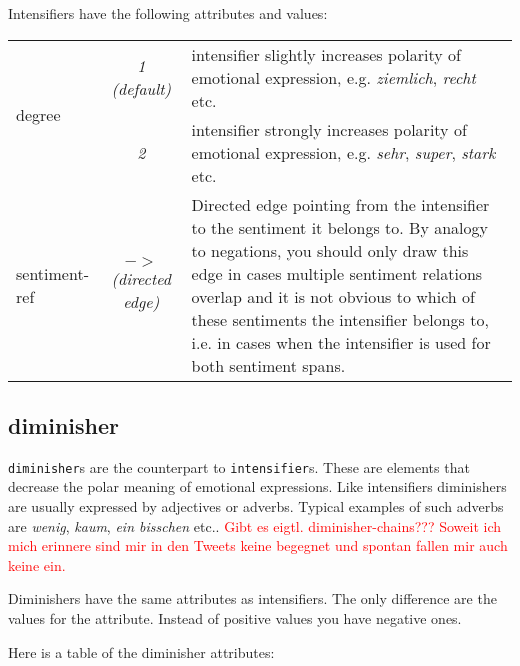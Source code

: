 \documentclass[11pt,a4paper]{article}
\begin{document}
Intensifiers have the following attributes and values: \newline

\begin{tabular}{|l|c|p{}|}\hline
  \multirow{2}{*}{degree} & \textit{1 (default)} & intensifier 
  slightly increases polarity of emotional
  expression, e.g. \textit{ziemlich},
  \textit{recht} etc.\\\cline{2-3}

  & \textit{2} & intensifier strongly increases polarity  of
  emotional expression, e.g. \textit{sehr}, \textit{super},
  \textit{stark} etc.\\\hline


  sentiment-ref & \textit{$->$\newline(directed edge)} & Directed
  edge pointing from the intensifier to the sentiment it belongs
  to. By analogy to negations, you should only draw this edge in cases
  multiple sentiment relations overlap and it is not obvious
  to which of these sentiments the intensifier belongs to,
  i.e. in cases when the intensifier is used for both
  sentiment spans.\\\hline
\end{tabular}


\subsection{diminisher}
\texttt{diminisher}s are the counterpart to \texttt{intensifier}s. 
These are elements that decrease the polar meaning of emotional expressions. 
Like intensifiers diminishers are usually expressed by adjectives or adverbs. Typical examples of such
adverbs are \textit{wenig}, \textit{kaum}, \textit{ein bisschen} etc.. 
\textcolor{red}{Gibt es eigtl. diminisher-chains??? Soweit ich mich erinnere sind mir in den Tweets keine begegnet und spontan fallen mir auch keine ein. }\newline

Diminishers have the same attributes as intensifiers. The only
difference are the values for the attribute. Instead of positive values you have 
negative ones. \newline 

Here is a table of the diminisher attributes: \newline
\end{document}
